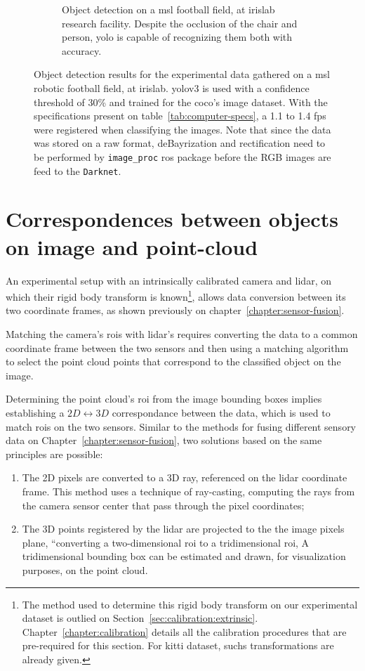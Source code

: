 \begin{figure}[ht]
\begin{subfigure}[t]{0.45\textwidth}
		\caption{Object detection on a \ac{msl} football field, at \ac{irislab} research facility. Despite the occlusion of the chair and person, \ac{yolo} is capable of recognizing them both with accuracy.}
		\label{fig:experimental-yolo-1}
	\end{subfigure}
	\caption{Object detection results for the experimental data gathered on a \ac{msl} robotic football field, at \ac{irislab}. \ac{yolo}v3 is used with a confidence threshold of 30\% and trained for the \ac{coco}'s image dataset. With the specifications present on table~\ref{tab:computer-specs}, a 1.1 to 1.4 \ac{fps} were registered when classifying the images. Note that since the data was stored on a raw format, deBayrization and rectification need to be performed by \texttt{image\_proc} \ac{ros} package before the RGB images are feed to the \texttt{Darknet}.}
	\label{fig:experimental-object-detection}
\end{figure}


\section{Correspondences between objects on image and point-cloud}
An experimental setup with an intrinsically calibrated camera and \ac{lidar}, on which their rigid body transform is known\footnote{The method used to determine this rigid body transform on our experimental dataset is outlied on Section~\ref{sec:calibration:extrinsic}. Chapter~\ref{chapter:calibration} details all the calibration procedures that are pre-required for this section. For \ac{kitti} dataset, suchs transformations are already given.}, allows data conversion between its two coordinate frames, as shown previously on chapter~\ref{chapter:sensor-fusion}. 

Matching the camera's \acp{roi} with \ac{lidar}'s requires converting the data to a common coordinate frame between the two sensors and then using a matching algorithm to select the point cloud points that correspond to the classified object on the image.

Determining the point cloud's \ac{roi} from the image bounding boxes implies establishing a $2D \leftrightarrow 3D$ correspondance between the data, which is used to match \acp{roi} on the two sensors. Similar to the methods for fusing different sensory data on Chapter~\ref{chapter:sensor-fusion}, two solutions based on the same principles are possible:

\begin{enumerate}
	\item The 2D pixels are converted to a 3D ray, referenced on the \ac{lidar} coordinate frame. This method uses a technique of ray-casting, computing the rays from the camera sensor center that pass through the pixel coordinates;
	\item The 3D points registered by the \ac{lidar} are projected to the the image pixels plane, ``converting a two-dimensional \ac{roi} to a tridimensional \ac{roi}, A tridimensional bounding box can be estimated and drawn, for visualization purposes, on the point cloud. 
\end{enumerate}

